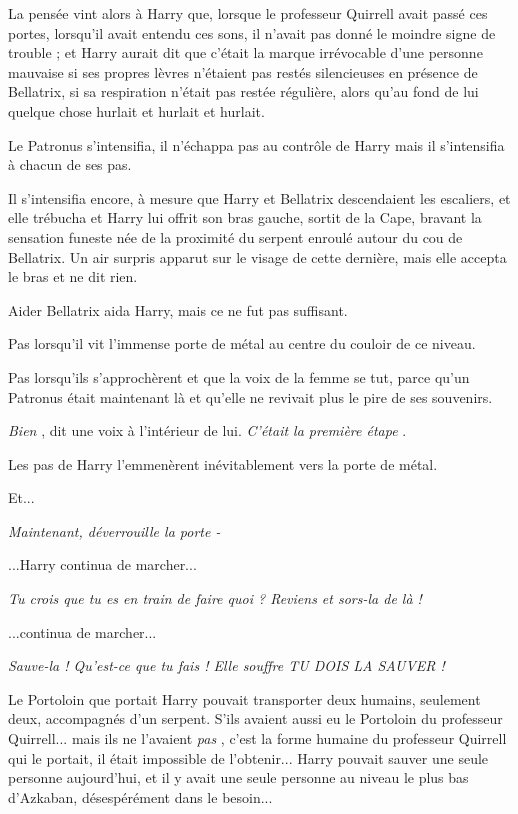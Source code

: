 La pensée vint alors à Harry que, lorsque le professeur Quirrell avait passé ces portes, lorsqu'il avait entendu ces sons, il n'avait pas donné le moindre signe de trouble ; et Harry aurait dit que c'était la marque irrévocable d'une personne mauvaise si ses propres lèvres n'étaient pas restés silencieuses en présence de Bellatrix, si sa respiration n'était pas restée régulière, alors qu'au fond de lui quelque chose hurlait et hurlait et hurlait.

Le Patronus s'intensifia, il n'échappa pas au contrôle de Harry mais il s'intensifia à chacun de ses pas.

Il s'intensifia encore, à mesure que Harry et Bellatrix descendaient les escaliers, et elle trébucha et Harry lui offrit son bras gauche, sortit de la Cape, bravant la sensation funeste née de la proximité du serpent enroulé autour du cou de Bellatrix. Un air surpris apparut sur le visage de cette dernière, mais elle accepta le bras et ne dit rien.

Aider Bellatrix aida Harry, mais ce ne fut pas suffisant.

Pas lorsqu'il vit l'immense porte de métal au centre du couloir de ce niveau.

Pas lorsqu'ils s'approchèrent et que la voix de la femme se tut, parce qu'un Patronus était maintenant là et qu'elle ne revivait plus le pire de ses souvenirs.

\emph{Bien} , dit une voix à l'intérieur de lui. \emph{C'était la première étape} .

Les pas de Harry l'emmenèrent inévitablement vers la porte de métal.

Et...

\emph{Maintenant, déverrouille la porte -} 

...Harry continua de marcher...

\emph{Tu crois que tu es en train de faire quoi ? Reviens et sors-la de là !} 

...continua de marcher...

\emph{Sauve-la ! Qu'est-ce que tu fais ! Elle souffre TU DOIS LA SAUVER !} 

Le Portoloin que portait Harry pouvait transporter deux humains, seulement deux, accompagnés d'un serpent. S'ils avaient aussi eu le Portoloin du professeur Quirrell... mais ils ne l'avaient \emph{pas} , c'est la forme humaine du professeur Quirrell qui le portait, il était impossible de l'obtenir... Harry pouvait sauver une seule personne aujourd'hui, et il y avait une seule personne au niveau le plus bas d'Azkaban, désespérément dans le besoin...

